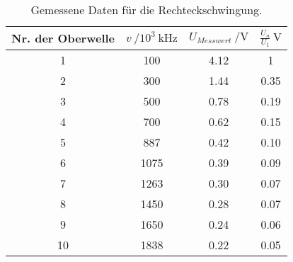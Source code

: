 \begin{table}[H]
  \centering
   \begin{tabular}{c c c c}
    \toprule
    Nr. der Oberwelle & $ v \:/10^{3}\: \si{\kHz}$ & $ U_{Messwert}\: / \si{\volt} $
    & $\frac{U_{n}}{U_{1}} \: \si{\volt} $  \\
    \midrule
    1 & 100 & 4.12 & 1 \\
    2 & 300 & 1.44 & 0.35 \\
    3 & 500 & 0.78 & 0.19 \\
    4 & 700 & 0.62 & 0.15 \\
    5 & 887 & 0.42 & 0.10 \\
    6 & 1075 & 0.39 & 0.09 \\
    7 & 1263 & 0.30 & 0.07 \\
    8 & 1450 & 0.28 & 0.07 \\
    9 & 1650 & 0.24 & 0.06 \\
    10 & 1838 & 0.22 & 0.05 \\
    \bottomrule
  \end{tabular}
  \caption{Gemessene Daten für die Rechteckschwingung.}
  \label{tab:tabe1}
\end{table}
